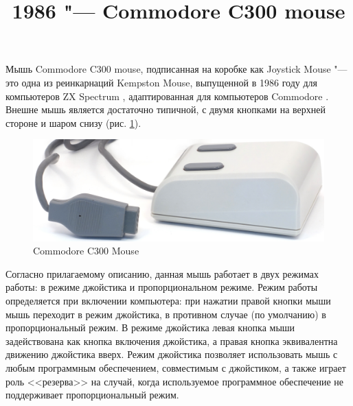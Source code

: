 \documentclass[11pt, a4paper]{article}
\begin{document}
\title{1986 "--- Commodore C300 mouse}
\date{}
\maketitle
{}
Мышь Commodore C300 mouse, подписанная на коробке как Joystick Mouse "--- это одна из реинкарнаций Kempston Mouse, выпущенной в 1986 году для компьютеров ZX Spectrum \cite{SinclairUser}, адаптированная для компьютеров Commodore \cite{c64wiki}. Внешне мышь является достаточно типичной, с двумя кнопками на верхней стороне и шаром снизу (рис. \ref{fig:C300Pic}).

\begin{figure}[h]
    \centering
    \includegraphics[scale=0.7]{1986_commodore_c300_mouse/cmnirm_30.jpg}
    \caption{Commodore C300 Mouse}
    \label{fig:C300Pic}
\end{figure}

Согласно прилагаемому описанию, данная мышь работает в двух режимах работы: в режиме джойстика и пропорциональном режиме. Режим работы определяется при включении компьютера: при нажатии правой кнопки мыши мышь переходит в режим джойстика, в противном случае (по умолчанию) в пропорциональный режим. В режиме джойстика левая кнопка мыши задействована как кнопка включения джойстика, а правая кнопка эквивалентна движению джойстика вверх. Режим джойстика позволяет использовать мышь с любым программным обеспечением, совместимым с джойстиком, а также играет роль <<резерва>> на случай, когда используемое программное обеспечение не поддерживает пропорциональный режим.
\end{document}
